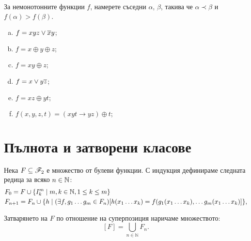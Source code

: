 \begin{problem}
  За немонотонните функции $f$, намерете съседни $\alpha$, $\beta$, такива че
  $\alpha \prec \beta$ и $f(\alpha) > f(\beta)$.
  \begin{enumerate}[a)]
  \item
    $f = xyz \vee \overline{x}y$;
  \item
    $f = x\oplus y\oplus z$;
  \item
    $f = xy\oplus z$;
  \item
    $f = x\vee y\overline{z}$;
  \item
    $f = xz\oplus yt$;
  \item
    $f(x,y,z,t) = (xyt\rightarrow yz)\oplus t$;
  \end{enumerate}
\end{problem}


\section{Пълнота и затворени класове}

\begin{dfn}
Нека $F\subseteq \mathscr{F}_2$ е множество от булеви функции. С
индукция дефинираме следната редица за всяко $n \in \mathbb{N}$:
\begin{align*}
  & F_0 = F\cup \{I^m_k \mid m,k\in\mathbb{N}, 1\leq k\leq m\}\\
  & F_{n+1} = F_n \cup \{h \mid (\exists f, g_1\dots g_m \in F_n)[h(x_1\dots x_k) =  f(g_1(x_1\dots x_k), \dots g_m(x_1\dots x_k)]\},
\end{align*}

Затварянето на $F$ по отношение на суперпозиция наричаме
множеството:
\[[F] = \bigcup_{n\in \mathbb{N}}F_n.\]

\end{dfn}

